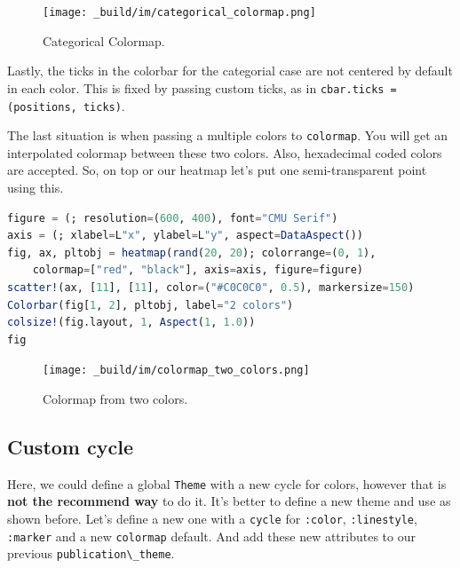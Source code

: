 \documentclass[
  notoc %
]{tufte-book}
\newcommand{\passthrough}[1]{#1}
\begin{document}
\begin{figure}
\hypertarget{fig:categorical_colormap}{%
\centering
\texttt{[image: \_build/im/categorical\_colormap.png]}
\caption{Categorical Colormap.}\label{fig:categorical_colormap}
}
\end{figure}

Lastly, the ticks in the colorbar for the categorial case are not
centered by default in each color. This is fixed by passing custom
ticks, as in \passthrough{\lstinline!cbar.ticks = (positions, ticks)!}.

The last situation is when passing a multiple colors to
\passthrough{\lstinline!colormap!}. You will get an interpolated
colormap between these two colors. Also, hexadecimal coded colors are
accepted. So, on top or our heatmap let's put one semi-transparent point
using this.

\begin{lstlisting}[language=Julia]
figure = (; resolution=(600, 400), font="CMU Serif")
axis = (; xlabel=L"x", ylabel=L"y", aspect=DataAspect())
fig, ax, pltobj = heatmap(rand(20, 20); colorrange=(0, 1),
    colormap=["red", "black"], axis=axis, figure=figure)
scatter!(ax, [11], [11], color=("#C0C0C0", 0.5), markersize=150)
Colorbar(fig[1, 2], pltobj, label="2 colors")
colsize!(fig.layout, 1, Aspect(1, 1.0))
fig
\end{lstlisting}

\begin{figure}
\hypertarget{fig:colormap_two_colors}{%
\centering
\texttt{[image: \_build/im/colormap\_two\_colors.png]}
\caption{Colormap from two colors.}\label{fig:colormap_two_colors}
}
\end{figure}

\hypertarget{custom-cycle}{%
\subsection{Custom cycle}\label{custom-cycle}}

Here, we could define a global \passthrough{\lstinline!Theme!} with a
new cycle for colors, however that is \textbf{not the recommend way} to
do it. It's better to define a new theme and use as shown before. Let's
define a new one with a \passthrough{\lstinline!cycle!} for
\passthrough{\lstinline!:color!}, \passthrough{\lstinline!:linestyle!},
\passthrough{\lstinline!:marker!} and a new
\passthrough{\lstinline!colormap!} default. And add these new attributes
to our previous \passthrough{\lstinline!publication\_theme!}.
\end{document}
